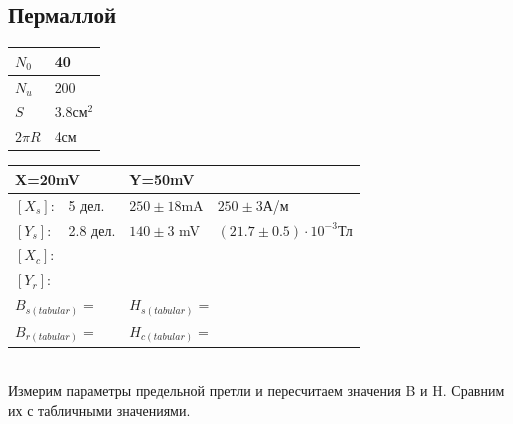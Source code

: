 \documentclass[12pt]{article}
\begin{document}
\subsection{Пермаллой}
\begin{minipage}{0.4\textwidth}
\begin{tabular}{|l|l|}
\hline
$N_0$ & 40        \\ \hline
$N_u$ & 200       \\ \hline
$S$   & 3.8см$^2$ \\ \hline
$2\pi R$ & 4см \\ \hline
\end{tabular}
\end{minipage}
\begin{minipage}{0.5\textwidth}
\begin{tabular}{|l|l|l|l|}
\hline
\multicolumn{2}{|l|}{X=20mV} & \multicolumn{2}{l|}{Y=50mV} \\ \hline
$[X_s]$:    & 5 дел.    & $250 \pm 18 $mA      &    $250 \pm 3$А/м  \\ \hline
$[Y_s]$:    & 2.8 дел.    & $140 \pm 3$ mV        &   $(21.7 \pm 0.5)\cdot10^{-3}$Тл   \\ \hline
$[X_c]$:    &              &                      &      \\ \hline
$[Y_r]$:    &              &                      &      \\ \hline
\multicolumn{2}{|l|}{$B_{s(tabular)} = $} & \multicolumn{2}{l|}{$H_{s(tabular)} = $} \\ \hline
\multicolumn{2}{|l|}{$B_{r(tabular)} = $} & \multicolumn{2}{l|}{$H_{c(tabular)} = $} \\ \hline
\end{tabular}
\end{minipage}\\

Измерим параметры предельной претли и пересчитаем значения B и H. Сравним их с табличными значениями.\\
\end{document}
